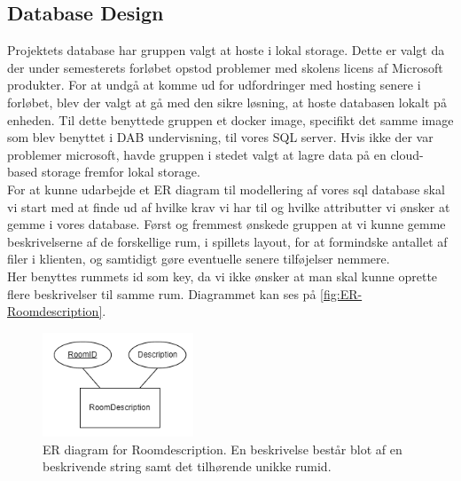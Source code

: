 \subsection{Database Design}

Projektets database har gruppen valgt at hoste i lokal storage. Dette er valgt da der under semesterets forløbet opstod problemer med skolens licens af Microsoft produkter. For at undgå at komme ud for udfordringer med hosting senere i forløbet, blev der valgt at gå med den sikre løsning, at hoste databasen lokalt på enheden. Til dette benyttede gruppen et docker image, specifikt det samme image som blev benyttet i DAB undervisning, til vores SQL server.
Hvis ikke der var problemer microsoft, havde gruppen i stedet valgt at lagre data på en cloud-based storage fremfor lokal storage.\\



For at kunne udarbejde et ER diagram til modellering af vores sql database skal vi start med at finde ud af hvilke krav vi har til og hvilke attributter vi ønsker at gemme i vores database.
Først og fremmest ønskede gruppen at vi kunne gemme beskrivelserne af de forskellige rum, i spillets layout, for at formindske antallet af filer i klienten, og samtidigt gøre eventuelle senere tilføjelser nemmere.\\ 
Her benyttes rummets id som key, da vi ikke ønsker at man skal kunne oprette flere beskrivelser til samme rum. Diagrammet kan ses på \autoref{fig:ER-Roomdescription}.

\begin{figure}[H]
\centering
\includegraphics[width = 0.4\textwidth]{02-Body/Images/ER-RoomDescription.PNG}
\caption{ER diagram for Roomdescription. En beskrivelse består blot af en beskrivende string samt det tilhørende unikke rumid.}
\label{fig:ER-Roomdescription}
\end{figure}

